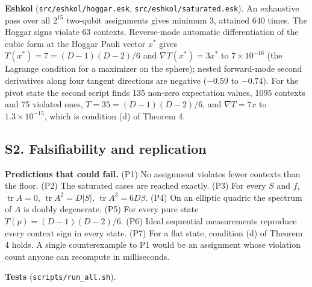 \documentclass[11pt,a4paper]{article}
\begin{document}
\textbf{Eshkol} (\texttt{src/eshkol/hoggar.esk}, \texttt{src/eshkol/saturated.esk}). An exhaustive pass over all \(2^{15}\)
two-qubit assignments gives minimum 3, attained 640 times. The Hoggar signs violate 63 contexts.
Reverse-mode automatic differentiation of the cubic form at the Hoggar Pauli vector \(x^\ast\) gives
\(T(x^\ast) = 7 = (D-1)(D-2)/6\) and \(\nabla T(x^\ast) = 3x^\ast\) to \(7\times10^{-16}\) (the Lagrange condition
for a maximizer on the sphere); nested forward-mode second derivatives along four tangent directions are
negative (\(-0.59\) to \(-0.74\)). For the pivot state the second script finds 135 non-zero expectation
values, 1095 contexts and 75 violated ones, \(T = 35 = (D-1)(D-2)/6\), and \(\nabla T = 7x\) to
\(1.3\times10^{-15}\), which is condition (d) of Theorem 4.

\subsection{S2. Falsifiability and replication}\label{s2-falsifiability-and-replication}

\textbf{Predictions that could fail.} (P1) No assignment violates fewer contexts than the floor. (P2) The
saturated cases are reached exactly. (P3) For every \(S\) and \(f\), \(\operatorname{tr}A = 0\),
\(\operatorname{tr}A^2 = D|S|\), \(\operatorname{tr}A^3 = 6D\beta\). (P4) On an elliptic quadric the spectrum of
\(A\) is doubly degenerate. (P5) For every pure state \(T(p) = (D-1)(D-2)/6\). (P6) Ideal sequential
measurements reproduce every context sign in every state. (P7) For a flat state, condition (d) of
Theorem 4 holds. A single counterexample to P1 would be an assignment whose violation count anyone can
recompute in milliseconds.

\textbf{Tests} (\texttt{scripts/run\_all.sh}).
\end{document}

